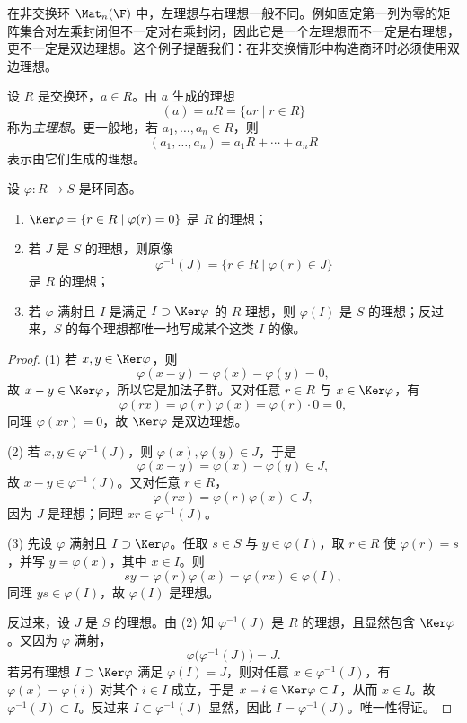 \begin{example}
在非交换环 $\Mat_n(\F)$ 中，左理想与右理想一般不同。例如固定第一列为零的矩阵集合对左乘封闭但不一定对右乘封闭，因此它是一个左理想而不一定是右理想，更不一定是双边理想。这个例子提醒我们：在非交换情形中构造商环时必须使用双边理想。
\end{example}

\begin{definition}
设 $R$ 是交换环，$a\in R$。由 $a$ 生成的理想
\[
(a)=aR=\{ar\mid r\in R\}
\]
称为\emph{主理想}。更一般地，若 $a_1,\dots,a_n\in R$，则
\[
(a_1,\dots,a_n)=a_1R+\cdots+a_nR
\]
表示由它们生成的理想。
\end{definition}

\begin{proposition}
设 $\varphi:R\to S$ 是环同态。
\begin{enumerate}[label=\textnormal{(\arabic*)}]
  \item $\Ker\varphi=\{r\in R\mid \varphi(r)=0\}$ 是 $R$ 的理想；
  \item 若 $J$ 是 $S$ 的理想，则原像
  \[
  \varphi^{-1}(J)=\{r\in R\mid \varphi(r)\in J\}
  \]
  是 $R$ 的理想；
  \item 若 $\varphi$ 满射且 $I$ 是满足 $I\supset \Ker\varphi$ 的 $R$-理想，则 $\varphi(I)$ 是 $S$ 的理想；反过来，$S$ 的每个理想都唯一地写成某个这类 $I$ 的像。
\end{enumerate}
\end{proposition}

\begin{proof}
(1) 若 $x,y\in\Ker\varphi$，则
\[
\varphi(x-y)=\varphi(x)-\varphi(y)=0,
\]
故 $x-y\in\Ker\varphi$，所以它是加法子群。又对任意 $r\in R$ 与 $x\in\Ker\varphi$，有
\[
\varphi(rx)=\varphi(r)\varphi(x)=\varphi(r)\cdot 0=0,
\]
同理 $\varphi(xr)=0$，故 $\Ker\varphi$ 是双边理想。

(2) 若 $x,y\in\varphi^{-1}(J)$，则 $\varphi(x),\varphi(y)\in J$，于是
\[
\varphi(x-y)=\varphi(x)-\varphi(y)\in J,
\]
故 $x-y\in\varphi^{-1}(J)$。又对任意 $r\in R$，
\[
\varphi(rx)=\varphi(r)\varphi(x)\in J,
\]
因为 $J$ 是理想；同理 $xr\in\varphi^{-1}(J)$。

(3) 先设 $\varphi$ 满射且 $I\supset\Ker\varphi$。任取 $s\in S$ 与 $y\in\varphi(I)$，取 $r\in R$ 使 $\varphi(r)=s$，并写 $y=\varphi(x)$，其中 $x\in I$。则
\[
sy=\varphi(r)\varphi(x)=\varphi(rx)\in\varphi(I),
\]
同理 $ys\in\varphi(I)$，故 $\varphi(I)$ 是理想。

反过来，设 $J$ 是 $S$ 的理想。由 (2) 知 $\varphi^{-1}(J)$ 是 $R$ 的理想，且显然包含 $\Ker\varphi$。又因为 $\varphi$ 满射，
\[
\varphi\bigl(\varphi^{-1}(J)\bigr)=J.
\]
若另有理想 $I\supset\Ker\varphi$ 满足 $\varphi(I)=J$，则对任意 $x\in\varphi^{-1}(J)$，有 $\varphi(x)=\varphi(i)$ 对某个 $i\in I$ 成立，于是 $x-i\in\Ker\varphi\subset I$，从而 $x\in I$。故 $\varphi^{-1}(J)\subset I$。反过来 $I\subset\varphi^{-1}(J)$ 显然，因此 $I=\varphi^{-1}(J)$。唯一性得证。
\end{proof}

